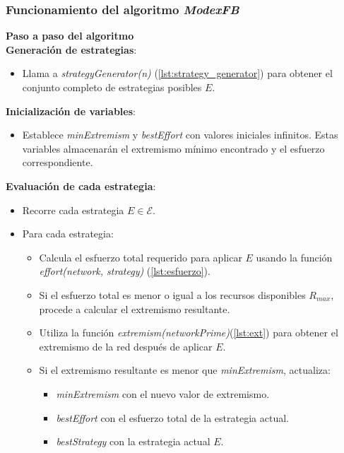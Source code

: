 \documentclass[letterpaper,10pt]{article}
\begin{document}
\subsubsection*{Funcionamiento del algoritmo \textit{ModexFB}}

\textbf{Paso a paso del algoritmo}
\\

\textbf{Generación de estrategias}:
\begin{itemize}
    \item Llama a \textit{strategyGenerator(n)} (\ref{lst:strategy_generator}) para obtener el conjunto completo de estrategias posibles $E$.
\end{itemize}

\textbf{Inicialización de variables}:
\begin{itemize}
    \item Establece \textit{minExtremism} y \textit{bestEffort} con valores iniciales infinitos. Estas variables almacenarán el extremismo mínimo encontrado y el esfuerzo correspondiente.
\end{itemize}

\textbf{Evaluación de cada estrategia}:
\begin{itemize}
    \item Recorre cada estrategia $E \in \mathcal{E}$.
    \item Para cada estrategia:
    \begin{itemize}
        \item Calcula el esfuerzo total requerido para aplicar $E$ usando la función \textit{effort(network, strategy)} (\ref{lst:esfuerzo}).
        \item Si el esfuerzo total es menor o igual a los recursos disponibles $R_{max}$, procede a calcular el extremismo resultante.
        \item Utiliza la función \textit{extremism(networkPrime)}(\ref{lst:ext}) para obtener el extremismo de la red después de aplicar $E$.
        \item Si el extremismo resultante es menor que \textit{minExtremism}, actualiza:
        \begin{itemize}
            \item \textit{minExtremism} con el nuevo valor de extremismo.
            \item \textit{bestEffort} con el esfuerzo total de la estrategia actual.
            \item \textit{bestStrategy} con la estrategia actual $E$.
        \end{itemize}
    \end{itemize}
\end{itemize}
\end{document}
